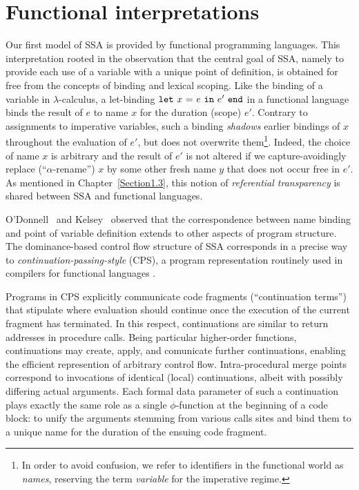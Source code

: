 %
%
%
%

\section{Functional interpretations}
\label{section:Part1:Semantics:FunctionalLanguages}

Our first model of SSA is provided by functional programming
languages. This interpretation rooted in the observation that the
central goal of SSA, namely to provide each use of a variable with a
unique point of definition, is obtained for free from the concepts of
binding and lexical scoping. Like the binding of a variable in
$\lambda$-calculus, a let-binding $\mathtt{let}\ {x}\ \mathtt{=}\ {e}\ \mathtt{in}\ {e'}\ \mathtt{end}$ in a functional
language binds the result of $e$ to name $x$ for the duration (scope)
$e'$.  Contrary to assignments to imperative variables, such a binding
\emph{shadows} earlier bindings of $x$ throughout the evaluation
of $e'$, but does not overwrite them\footnote{In order to avoid
confusion, we refer to identifiers in the functional world as
\emph{names}, reserving the term \emph{variable} for the imperative
regime.}. Indeed, the choice of name $x$ is arbitrary and the
result of $e'$ is not altered if we capture-avoidingly replace
(``$\alpha$-rename'') $x$ by some other fresh name $y$ that does not
occur free in $e'$. As mentioned in Chapter~\ref{Section1.3}, this
notion of \emph{referential transparency} is shared between SSA and
functional languages.

O'Donnell~\cite{ODonnellPhD} and Kelsey~\cite{Kelsey95} observed that
the correspondence between name binding and point of variable
definition extends to other aspects of program structure. The
dominance-based control flow structure of SSA corresponds in a precise
way to \emph{continuation-passing-style} (CPS), a program
representation routinely used in compilers for functional languages
\cite{DBLP:journals/lisp/SussmanS98a,Appel:CWC}.

Programs in CPS explicitly communicate code fragments (``continuation
terms'') that stipulate where evaluation should continue once the
execution of the current fragment has terminated. In this respect,
continuations are similar to return addresses in procedure
calls. Being particular higher-order functions, continuations may
create, apply, and comunicate further continuations, enabling the
efficient represention of arbitrary control flow.  Intra-procedural
merge points correspond to invocations of identical (local)
continuations, albeit with possibly differing actual arguments.  Each
formal data parameter of such a continuation plays exactly the same
role as a single $\phi$-function at the beginning of a code block: to
unify the arguments stemming from various calls sites and bind them to
a unique name for the duration of the ensuing code fragment.


